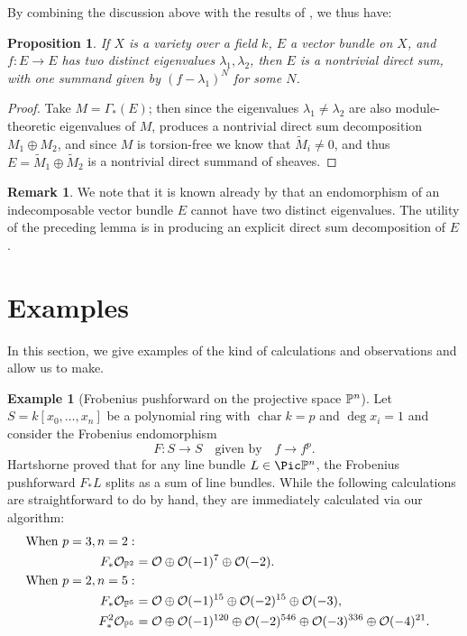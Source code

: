 \documentclass[12pt]{article}
\let\l\lambda
\def\OO{\mathcal O}
\theoremstyle{theorem}
\numberwithin{thm}{section}
\newtheorem{prop}[thm]{Proposition}
\theoremstyle{definition}
\newtheorem{exa}[thm]{Example}
\newtheorem{rem}[thm]{Remark}
\begin{document}
By combining the discussion above with the results of , we thus have:

\begin{prop}
  If $X$ is a variety over a field $k$,
  $E$ a vector bundle on $X$, and $f:E\to E$ has two distinct eigenvalues $\l_1,\l_2$, then $E$ is a nontrivial direct sum, with one summand given by $(f-\l_1)^{N}$ for some $N$.
\end{prop}

\begin{proof}
  Take $M= \Gamma_*(E)$; then since the eigenvalues $\l_1\neq \l_2$ are also module-theoretic eigenvalues of $M$,  produces a nontrivial direct sum decomposition $M_1\oplus M_2$, and since $M$ is torsion-free we know that $\widetilde M_i\neq 0$, and thus $E=\widetilde M_1\oplus \widetilde M_2$ is a nontrivial direct summand of sheaves.
\end{proof}

\begin{rem}
  We note that it is known already by \cite[Proposition~15]{Atiyah57} that an endomorphism of an indecomposable vector bundle $E$ cannot have two distinct eigenvalues. The utility of the preceding lemma is in producing an explicit direct sum decomposition of $E$.
\end{rem}



\section{Examples}
\label{sec:examples}

In this section, we give examples of the kind of calculations and observations  and  allow us to make.

\renewcommand{\char}{\operatorname{char}}

\begin{exa}[Frobenius pushforward on the projective space $\P^n$]
  Let $S = k[x_0,\dots,x_n]$ be a polynomial ring with $\char k = p$ and $\deg x_i = 1$ and consider the Frobenius endomorphism
  \[ F\colon S\to S \quad \text{given by} \quad f \to f^p. \]
  Hartshorne \cite{Hartshorne1970} proved that for any line bundle $L\in\Pic\P^n$, the Frobenius pushforward $F_*L$ splits as a sum of line bundles. While the following calculations are straightforward to do by hand, they are immediately calculated via our algorithm:
  \begin{align*}
    \text{When }p=3, n=2: \\
    F_*\OO_{\P^2} &= \OO \oplus \OO(-1)^7 \oplus \OO(-2). \\
    \text{When } p=2, n=5: \\
    F_*\OO_{\P^5} &= \OO \oplus \OO(-1)^{15} \oplus \OO(-2)^{15} \oplus \OO(-3), \\
    F_*^2\OO_{\P^5} &= \OO \oplus \OO(-1)^{120} \oplus \OO(-2)^{546} \oplus \OO(-3)^{336} \oplus \OO(-4)^{21}.
  \end{align*}
\end{exa}
\end{document}
